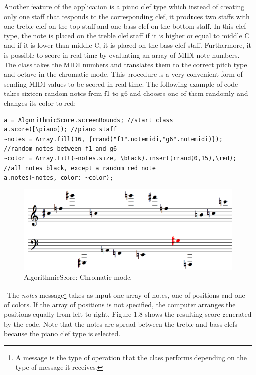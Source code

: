 Another feature of the application is a piano clef type which instead of creating only one staff that responds to the corresponding clef, it produces two staffs with one treble clef on the top staff and one bass clef on the bottom staff. In this clef type, the note is placed on the treble clef staff if it is higher or equal to middle C and if it is lower than middle C, it is placed on the bass clef staff. Furthermore, it is possible to score in real-time by evaluating an array of MIDI note numbers. The class takes the MIDI numbers and translates them to the correct pitch type and octave in the chromatic mode. This procedure is a very convenient form of sending MIDI values to be scored in real time. The following example of code takes sixteen random notes from f1 to g6 and chooses one of them randomly and changes its color to red:
\begin{verbatim}
a = AlgorithmicScore.screenBounds; //start class
a.score([\piano]); //piano staff
~notes = Array.fill(16, {rrand("f1".notemidi,"g6".notemidi)}); 
//random notes between f1 and g6
~color = Array.fill(~notes.size, \black).insert(rrand(0,15),\red);
//all notes black, except a random red note
a.notes(~notes, color: ~color);
\end{verbatim}
\begin{figure}[htbp] %
   \centering
   \includegraphics[width=14cm]{Chapter4/algoscore2.tif} %
   \caption{AlgorithmicScore: Chromatic mode.}
   \label{fig:example}
\end{figure}\
The \emph{notes} message\footnote{A message is the type of operation that the class performs depending on the type of message it receives.} takes as input one array of notes, one of positions and one of colors. If the array of positions is not specified, the computer arranges the positions equally from left to right. Figure 1.8 shows the resulting score generated by the code. Note that the notes are spread between the treble and bass clefs because the piano clef type is selected. 

